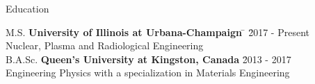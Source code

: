 \documentclass{resume2} %
\begin{document}
\centering
\iffalse
I am an engineer that is passionate about \\ 
nuclear technology and developing innovative \\
systems to face today's energy challenges.   

Gwen is passionate about nuclear power and developing \\
innovative systems to improve nuclear energy and fuel cycle\\
technologies. She wants to contribute to pressing global\\
energy challenges and environmental sustainability. 
\fi

\raggedright

\begin{rSection}{Education}
	
\begin{tabbing}
M.S. \hspace*{2 em}\= \textbf{University of Illinois at Urbana-Champaign} \hspace*{5em} \= \hspace*{6em} \= 2017 - Present \\
\> Nuclear, Plasma and Radiological Engineering \\
%
B.A.Sc. \hspace*{2 em}\> \textbf{Queen's University at Kingston, Canada} \> \hspace*{7.2em} \= 2013 - 2017 \\
\> Engineering Physics with a specialization in Materials Engineering
\end{tabbing}

\end{rSection}

\end{document}

